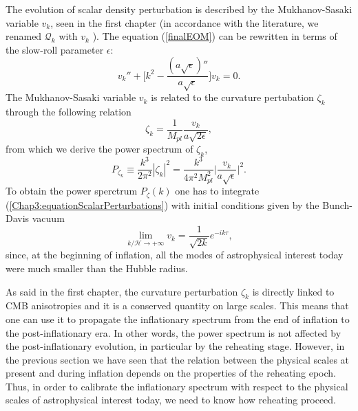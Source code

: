 \documentclass[11pt,a4paper,twoside]{book}
\begin{document}
 The evolution of scalar density perturbation is described by the Mukhanov-Sasaki variable $ v_{k} $, seen in the first chapter (in accordance with the literature, we renamed $ \mathcal{Q}_{k} $ with $ v_{k} $ ). The equation (\ref{finalEOM}) can be rewritten in terms of the slow-roll parameter $\epsilon$:
 \begin{equation}
\label{Chap3:equationScalarPerturbations}
v_{k}'' + \Bigg[k^{2} - \frac{(a\sqrt{\epsilon})''}{a\sqrt{\epsilon}}\Bigg]v_{k}=0.
 \end{equation}
The Mukhanov-Sasaki variable $ v_{k} $ is related to the curvature pertubation $\zeta_{k}$ through the following relation
\begin{equation}
	\label{Chap3:Zetak}
	\zeta_{k} = \frac{1}{M_{pl}}\frac{v_{k}}{a\sqrt{2\epsilon}},
\end{equation}
from which we derive the power spectrum of $ \zeta_{k} $,
\begin{equation}
	\label{Chap3:PowerSpectrum}
	P_{\zeta_{k}} \equiv \frac{k^{3}}{2\pi^{2}}|\zeta_{k}|^{2}=\frac{k^{3}}{4\pi^{2}M_{pl}^{2}}\Bigg|\frac{v_{k}}{a\sqrt{\epsilon}}\Bigg|^{2}.
\end{equation}
To obtain the power sperctrum $ P_{\zeta}(k) $ one has to integrate (\ref{Chap3:equationScalarPerturbations}) with initial conditions given by the Bunch-Davis vacuum 
\begin{equation}
	\label{Chap3:BunchDavis}
	\lim_{k/\mathcal{H} \rightarrow +\infty} v_{k} = \frac{1}{\sqrt{2k}}e^{-ik\tau},
\end{equation}
since, at the beginning of inflation, all the modes of astrophysical interest today were much smaller than the Hubble radius.

As said in the first chapter, the curvature perturbation $\zeta_{k}$ is directly linked to CMB anisotropies and it is a conserved quantity on large scales. This means that one can use it to propagate the inflationary spectrum from the end of inflation to the post-inflationary era. In other words, the power spectrum is not affected by the post-inflationary evolution, in particular by the reheating stage. However, in the previous section we have seen that the relation between the physical scales at present and during inflation depends on the properties of the reheating epoch. Thus, in order to calibrate the inflationary spectrum with respect to the physical scales of astrophysical interest today, we need to know how reheating proceed.
\end{document}
